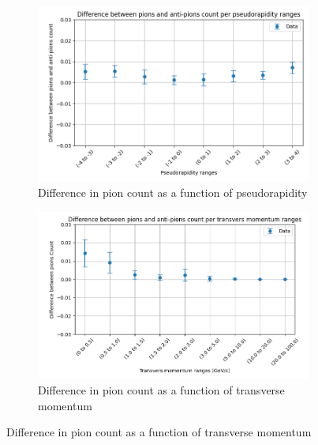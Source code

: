 \begin{figure}[H]
  \begin{subfigure}{0.49\textwidth}
    \centering
    \includegraphics[width=\linewidth]{lab report/Figure_3_final.png}
    \caption{Difference in pion count as a function of pseudorapidity}
    \label{fig:subfig3}
  \end{subfigure}
  \hfill
  \begin{subfigure}{0.49\textwidth}
    \centering
    \includegraphics[width=\linewidth]{lab report/Figure_4_final.png}
    \caption{Difference in pion count as a function of transverse momentum}
    \label{fig:subfig4}
  \end{subfigure}
\end{figure}
